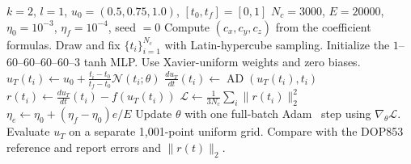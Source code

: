 \begin{algorithm}[tbp]
\caption{Training and evaluation of the hard-IC Lorenz--1960 PINN}
\label{alg:hard-ic-pinn}
\begin{algorithmic}[1]
\Require $k=2$, $l=1$, $u_0=(0.5,0.75,1.0)$, $[t_0,t_f]=[0,1]$
\Require $N_c=3000$, $E=20000$, $\eta_0=10^{-3}$, $\eta_f=10^{-4}$, seed $=0$
\State Compute $(c_x,c_y,c_z)$ from the coefficient formulas.
\State Draw and fix $\{t_i\}_{i=1}^{N_c}$ with Latin-hypercube sampling.
\State Initialize the $1$--$60$--$60$--$60$--$60$--$3$ tanh MLP.
\State Use Xavier-uniform weights and zero biases.
    \State $u_T(t_i)\gets u_0+\frac{t_i-t_0}{t_f-t_0}\mathcal{N}(t_i;\theta)$
    \State $\frac{d u_T}{d t}(t_i)\gets\operatorname{AD}(u_T(t_i),t_i)$
    \State $r(t_i)\gets\frac{d u_T}{d t}(t_i)-f(u_T(t_i))$
    \State $\mathcal{L}\gets\frac{1}{3N_c}\sum_i\|r(t_i)\|_2^2$
    \State $\eta_e\gets\eta_0+(\eta_f-\eta_0)e/E$
    \State Update $\theta$ with one full-batch Adam~\cite{kingma2015} step using $\nabla_\theta\mathcal{L}$.
\EndFor
\State Evaluate $u_T$ on a separate 1,001-point uniform grid.
\State Compare with the DOP853~\cite{hairer1993} reference and report errors and $\|r(t)\|_2$.
\end{algorithmic}
\end{algorithm}